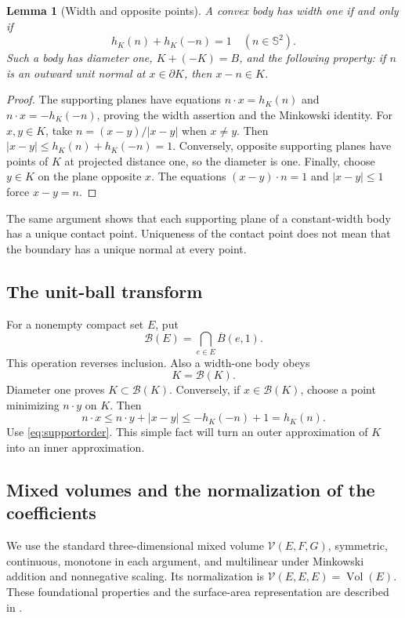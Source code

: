 \documentclass[11pt]{article}
\numberwithin{equation}{section}
\newtheorem{lemma}[theorem]{Lemma}
\theoremstyle{definition}\newtheorem{definition}[theorem]{Definition}
\theoremstyle{remark}\newtheorem{remark}[theorem]{Remark}
\newcommand{\Sph}{\mathbb S^2}
\newcommand{\B}{\mathcal B}
\newcommand{\Vol}{\operatorname{Vol}}
\newcommand{\mix}{\mathcal V}
\begin{document}
\begin{lemma}[Width and opposite points]\label{lem:width}
A convex body has width one if and only if
\begin{equation}\label{eq:width}
 h_K(n)+h_K(-n)=1\quad(n\in\Sph).
\end{equation}
Such a body has diameter one, $K+(-K)=B$, and the following property: if $n$
is an outward unit normal at $x\in\partial K$, then $x-n\in K$.
\end{lemma}
\begin{proof}
The supporting planes have equations $n\cdot x=h_K(n)$ and
$n\cdot x=-h_K(-n)$, proving the width assertion and the Minkowski identity.
For $x,y\in K$, take $n=(x-y)/|x-y|$ when $x\ne y$. Then
$|x-y|\le h_K(n)+h_K(-n)=1$. Conversely, opposite supporting planes have
points of $K$ at projected distance one, so the diameter is one. Finally,
choose $y\in K$ on the plane opposite $x$. The equations
$(x-y)\cdot n=1$ and $|x-y|\le1$ force $x-y=n$.
\end{proof}
The same argument shows that each supporting plane of a constant-width body
has a unique contact point. Uniqueness of the contact point does not mean
that the boundary has a unique normal at every point.

\subsection{The unit-ball transform}
For a nonempty compact set $E$, put
\[
 \B(E)=\bigcap_{e\in E}\overline B(e,1).
\]
This operation reverses inclusion. Also a width-one body obeys
\begin{equation}\label{eq:selfdual}
 K=\B(K).
\end{equation}
Diameter one proves $K\subset\B(K)$. Conversely, if $x\in\B(K)$, choose a
point minimizing $n\cdot y$ on $K$. Then
\[
 n\cdot x\le n\cdot y+|x-y|\le-h_K(-n)+1=h_K(n).
\]
Use \cref{eq:supportorder}. This simple fact will turn an outer approximation
of $K$ into an inner approximation.

\subsection{Mixed volumes and the normalization of the coefficients}
We use the standard three-dimensional mixed volume $\mix(E,F,G)$, symmetric,
continuous, monotone in each argument, and multilinear under Minkowski
addition and nonnegative scaling. Its normalization is
$\mix(E,E,E)=\Vol(E)$. These foundational properties and the surface-area
representation are described in \cite[Chapter 5]{Schneider}.
\end{document}
